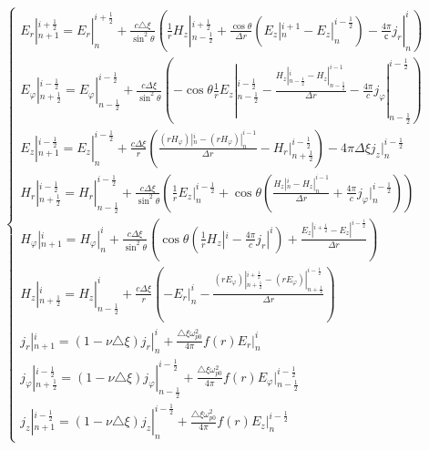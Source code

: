\documentclass[a4paper]{article}
\begin{document}
\begin{equation}
	\begin{cases}
		E_{r}|^{i+\frac{1}{2}}_{n+1}=E_{r}|^{i+\frac{1}{2}}_{n}+\frac{c\triangle\xi}{\sin^{2}\theta} \left(\frac{1}{r}H_{z}|^{i+\frac{1}{2}}_{n-\frac{1}{2}}+\frac{\cos\theta}{\Delta r}\left(E_{z}|_{n}^{i+1}-E_{z}|_{n}^{i-\frac{1}{2}}\right)-\frac{4\pi}{с} j_{r}|^{i}_{n}\right)\\
		E_{\varphi}|^{i-\frac{1}{2}}_{n+\frac{1}{2}}=E_{\varphi}|^{i-\frac{1}{2}}_{n-\frac{1}{2}}+\frac{c\Delta\xi}{\sin^{2}\theta}\left(-\cos\theta\frac{1}{r}E_{z}|_{n-\frac{1}{2}}^{i-\frac{1}{2}}-\frac{H_{z}|^{i}_{n-\frac{1}{2}}-H_{z}|^{i-1}_{n-\frac{1}{2}}}{\Delta r}-\frac{4\pi}{c} j_{\varphi}|^{i-\frac{1}{2}}_{n-\frac{1}{2}}\right)\\
		E_{z}|^{i-\frac{1}{2}}_{n+1}=E_{z}|^{i-\frac{1}{2}}_{n}+\frac{c\Delta\xi}{r}\left(\frac{\left(rH_{\varphi}\right)|^{i}_{n}-\left(rH_{\varphi}\right)|^{i-1}_{n}}{\Delta r}-H_{r}|^{i-\frac{1}{2}}_{n+\frac{1}{2}}\right)-4\pi\Delta\xi j_{z}|^{i-\frac{1}{2}}_{n}\\			H_{r}|^{i-\frac{1}{2}}_{n+\frac{1}{2}}=H_{r}|^{i-\frac{1}{2}}_{n-\frac{1}{2}}+\frac{c\Delta\xi}{\sin^{2}\theta}\left(\frac{1}{r}E_{z}|^{i-\frac{1}{2}}_{n}+\cos\theta\left(\frac{H_{z}|^{i}_{n}-H_{z}|^{i-1}_{n}}{\Delta r}+\frac{4\pi}{c}j_{\varphi}|^{i-\frac{1}{2}}_{n}\right)\right)\\
		H_{\varphi}|^{i}_{n+1}=H_{\varphi}|^{i}_{n}+\frac{c\Delta\xi}{\sin^{2}\theta}\left(\cos\theta\left(\frac{1}{r}H_{z}|^{i}-\frac{4\pi}{c}j_{r}|^{i}\right)+\frac{E_{z}|^{i+\frac{1}{2}}-E_{z}|^{i-\frac{1}{2}}}{\Delta r}\right)\\
		H_{z}|^{i}_{n+\frac{1}{2}}=H_{z}|^{i}_{n-\frac{1}{2}}+\frac{c\Delta\xi}{r}\left(-E_{r}|^{i}_{n}-\frac{(rE_{\varphi})|^{i+\frac{1}{2}}_{n+\frac{1}{2}}-(rE_{\varphi})|^{i-\frac{1}{2}}_{n+\frac{1}{2}}}{\Delta r}\right)\\
		j_{r}|^{i}_{n+1}=(1-\nu\triangle\xi) j_{r}|^{i}_{n}+\frac{\triangle\xi\omega_{p0}^{2}}{4\pi} f(r)E_{r}|^{i}_{n}\\
		j_{\varphi}|^{i-\frac{1}{2}}_{n+\frac{1}{2}}=(1-\nu\triangle\xi) j_{\varphi}|^{i-\frac{1}{2}}_{n-\frac{1}{2}}+\frac{\triangle\xi\omega_{p0}^{2}}{4\pi}f(r)E_{\varphi}|^{i-\frac{1}{2}}_{n-\frac{1}{2}}\\
		j_{z}|^{i-\frac{1}{2}}_{n+1}=(1-\nu\triangle\xi)j_{z}|^{i-\frac{1}{2}}_{n}+\frac{\triangle\xi\omega_{p0}^{2}}{4\pi} f(r)E_{z}|^{i-\frac{1}{2}}_{n}
	\end{cases}
\end{equation}
	
\end{document}
